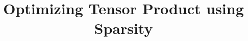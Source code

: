 \documentclass[conference]{IEEEtran}
\begin{document}
\title{Optimizing Tensor Product using Sparsity}

\author{
\and
{}
\and
{}
}

\maketitle

\begin{abstract}

\end{abstract}








\end{document}
